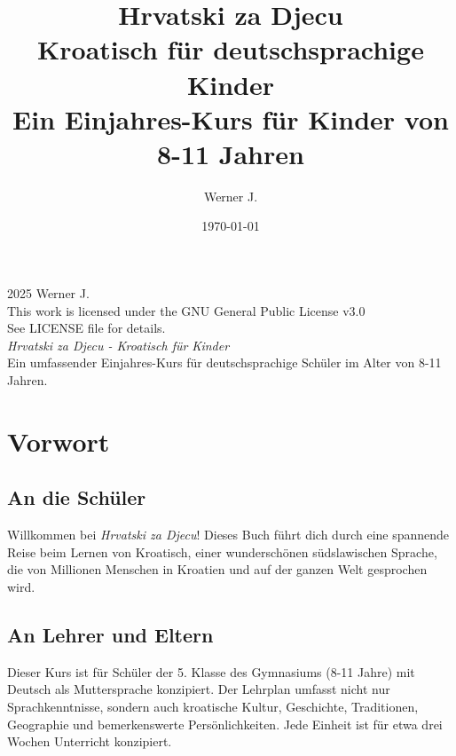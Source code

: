 \documentclass[11pt,a4paper,twoside]{book}
\title{\Huge\textbf{Hrvatski za Djecu}\\[0.5cm]
\Large Kroatisch für deutschsprachige Kinder\\[0.3cm]
\large Ein Einjahres-Kurs für Kinder von 8-11 Jahren}
\author{Werner J.}
\date{\today}
\begin{document}
\maketitle

\thispagestyle{empty}
\vspace*{\fill}
\begin{center}
\textcopyright{} 2025 Werner J.\\[0.5cm]
This work is licensed under the GNU General Public License v3.0\\
See LICENSE file for details.\\[1cm]
\textit{Hrvatski za Djecu - Kroatisch für Kinder}\\
Ein umfassender Einjahres-Kurs für deutschsprachige Schüler im Alter von 8-11 Jahren.
\end{center}
\vspace*{\fill}
\clearpage

\tableofcontents
\clearpage

\chapter*{Vorwort}

\section*{An die Schüler}
Willkommen bei \textit{Hrvatski za Djecu}! Dieses Buch führt dich durch eine spannende Reise beim Lernen von Kroatisch, einer wunderschönen südslawischen Sprache, die von Millionen Menschen in Kroatien und auf der ganzen Welt gesprochen wird.

\section*{An Lehrer und Eltern}
Dieser Kurs ist für Schüler der 5. Klasse des Gymnasiums (8-11 Jahre) mit Deutsch als Muttersprache konzipiert. Der Lehrplan umfasst nicht nur Sprachkenntnisse, sondern auch kroatische Kultur, Geschichte, Traditionen, Geographie und bemerkenswerte Persönlichkeiten. Jede Einheit ist für etwa drei Wochen Unterricht konzipiert.
\end{document}
